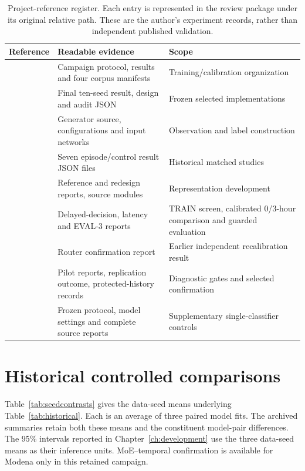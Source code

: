 \begin{table}[tbp]\centering\small
\caption[Register of project evidence]{Project-reference register. Each entry is represented in the review package under its original relative path. These are the author's experiment records, rather than independent published validation.}
\begin{tabularx}{\linewidth}{@{}lYY@{}}\toprule
Reference & Readable evidence & Scope\\\midrule
\cite{projectcampaign} & Campaign protocol, results and four corpus manifests & Training/calibration organization\\
\cite{projectfinal} & Final ten-seed result, design and audit JSON & Frozen selected implementations\\
\cite{projectgenerator} & Generator source, configurations and input networks & Observation and label construction\\
\cite{projectepisode} & Seven episode/control result JSON files & Historical matched studies\\
\cite{projectreference} & Reference and redesign reports, source modules & Representation development\\
\cite{projectdelay} & Delayed-decision, latency and EVAL-3 reports & TRAIN screen, calibrated 0/3-hour comparison and guarded evaluation\\
\cite{projectrouter} & Router confirmation report & Earlier independent recalibration result\\
\cite{projecthistory} & Pilot reports, replication outcome, protected-history records & Diagnostic gates and selected confirmation\\
\cite{projectbaseline} & Frozen protocol, model settings and complete source reports & Supplementary single-classifier controls\\
\bottomrule\end{tabularx}\end{table}

\section{Historical controlled comparisons}
Table~\ref{tab:seedcontrasts} gives the data-seed means underlying Table~\ref{tab:historical}. Each is an average of three paired model fits. The archived summaries retain both these means and the constituent model-pair differences. The 95\% intervals reported in Chapter~\ref{ch:development} use the three data-seed means as their inference units. MoE--temporal confirmation is available for Modena only in this retained campaign.

